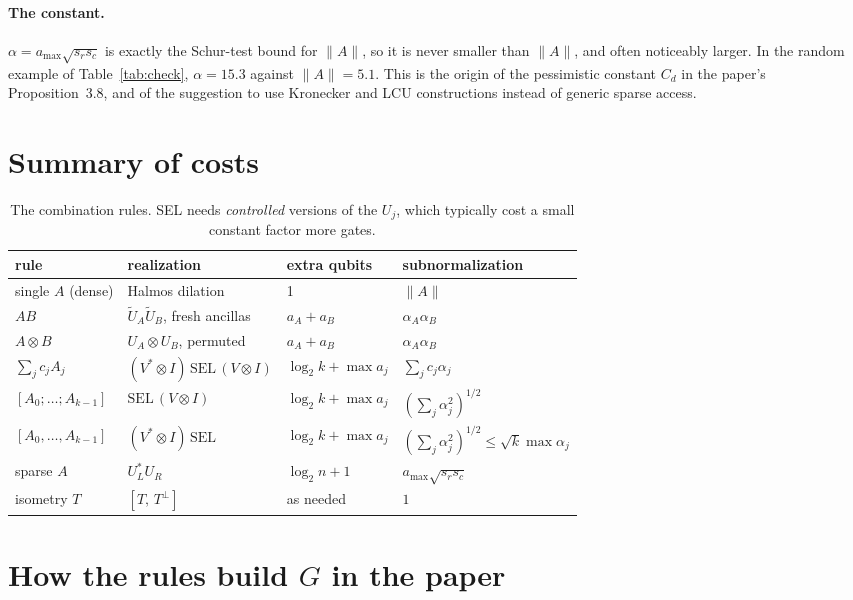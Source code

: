 \documentclass[11pt,a4paper]{article}
\begin{document}
\paragraph{The constant.} $\alpha=a_{\max}\sqrt{s_rs_c}$ is exactly the Schur-test bound for
$\|A\|$, so it is never smaller than $\|A\|$, and often noticeably larger. In
the random example of Table~\ref{tab:check}, $\alpha=15.3$ against $\|A\|=5.1$. This is
the origin of the pessimistic constant $C_d$ in the paper's
Proposition~3.8, and of the suggestion to use Kronecker and LCU
constructions instead of generic sparse access.

\section{Summary of costs}

\begin{table}[ht]
\centering\small
\begin{tabular}{llll}
\toprule
rule & realization & extra qubits & subnormalization\\
\midrule
single $A$ (dense) & Halmos dilation & 1 & $\|A\|$\\
$AB$ & $\widetilde U_A\widetilde U_B$, fresh ancillas & $a_A+a_B$ & $\alpha_A\alpha_B$\\
$A\otimes B$ & $U_A\otimes U_B$, permuted & $a_A+a_B$ & $\alpha_A\alpha_B$\\
$\sum_jc_jA_j$ & $(V^*\otimes I)\,\mathrm{SEL}\,(V\otimes I)$ & $\log_2k+\max a_j$ & $\sum_jc_j\alpha_j$\\
$[A_0;\dots;A_{k-1}]$ & $\mathrm{SEL}\,(V\otimes I)$ & $\log_2k+\max a_j$ & $(\sum_j\alpha_j^2)^{1/2}$\\
$[A_0,\dots,A_{k-1}]$ & $(V^*\otimes I)\,\mathrm{SEL}$ & $\log_2k+\max a_j$ & $(\sum_j\alpha_j^2)^{1/2}\le\sqrt k\max\alpha_j$\\
sparse $A$ & $U_L^*U_R$ & $\log_2n+1$ & $a_{\max}\sqrt{s_rs_c}$\\
isometry $T$ & $[T,\,T^\perp]$ & as needed & $1$\\
\bottomrule
\end{tabular}
\caption{The combination rules. SEL needs \emph{controlled} versions of the $U_j$,
which typically cost a small constant factor more gates.}
\label{tab:rules}
\end{table}

\section{\texorpdfstring{How the rules build $G$ in the paper}{How the rules build G in the paper}}
\end{document}
